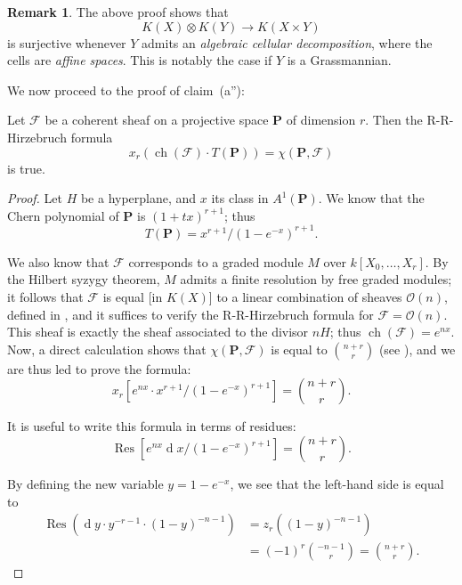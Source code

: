 \documentclass{article}
\theoremstyle{plain}
\newenvironment{proposition}[1]
    {\renewcommand\theinnercustomproposition{#1}\innercustomproposition}
    {\endinnercustomproposition}
\theoremstyle{definition}
\newtheorem*{remark}{Remark}
\newcommand{\sh}[1]{{\mathscr{#1}}}
\newcommand{\PP}{\mathbf{P}}
\newcommand{\dd}{\operatorname{d}\!}
\DeclareMathOperator{\ch}{ch}
\newcommand{\oldpage}[1]{\marginpar{\footnotesize$\Big\vert$ \textit{p.~#1}}}
\begin{document}
\begin{remark}
  The above proof shows that
  \[
    K(X)\otimes K(Y) \to K(X\times Y)
  \]
  is surjective whenever $Y$ admits an \emph{algebraic cellular decomposition}, where the cells are \emph{affine spaces}.
  This is notably the case if $Y$ is a Grassmannian.
\end{remark}

We now proceed to the proof of claim~(a''):

\begin{proposition}{10}
\label{proposition10}
  Let $\sh{F}$ be a coherent sheaf on a projective space $\PP$
\oldpage{119}
  of dimension $r$.
  Then the R-R-Hirzebruch formula
  \[
    x_r(\ch(\sh{F})\cdot T(\PP)) = \chi(\PP,\sh{F})
  \]
  is true.
\end{proposition}

\begin{proof}
  Let $H$ be a hyperplane, and $x$ its class in $A^1(\PP)$.
  We know that the Chern polynomial of $\PP$ is $(1+tx)^{r+1}$;
  thus
  \[
    T(\PP) = x^{r+1}/(1-e^{-x})^{r+1}.
  \]

  We also know that $\sh{F}$ corresponds to a graded module $M$ over $k[X_0,\ldots,X_r]$.
  By the Hilbert syzygy theorem, $M$ admits a finite resolution by free graded modules;
  it follows that $\sh{F}$ is equal [in $K(X)$] to a linear combination of sheaves $\sh{O}(n)$, defined in \cite[p.~246]{12}, and it suffices to verify the R-R-Hirzebruch formula for $\sh{F}=\sh{O}(n)$.
  This sheaf is exactly the sheaf associated to the divisor $nH$;
  thus $\ch(\sh{F})=e^{nx}$.
  Now, a direct calculation shows that $\chi(\PP,\sh{F})$ is equal to $\binom{n+r}{r}$ (see \cite[p.~275]{12}), and we are thus led to prove the formula:
  \[
  \label{10equation*}
    x_r[e^{nx}\cdot x^{r+1}/(1-e^{-x})^{r+1}] = \binom{n+r}{r}.
    \tag{$\star$}
  \]

  It is useful to write this formula in terms of residues:
  \[
  \label{10equation**}
    \operatorname{Res}[e^{nx}\dd x/(1-e^{-x})^{r+1}] = \binom{n+r}{r}.
    \tag{$\star\star$}
  \]

  By defining the new variable $y=1-e^{-x}$, we see that the left-hand side is equal to
  \begin{align*}
    \operatorname{Res}(\dd y\cdot y^{-r-1}\cdot(1-y)^{-n-1})
    &= z_r((1-y)^{-n-1})
  \\&= (-1)^r\binom{-n-1}{r}
    = \binom{n+r}{r}.
  \end{align*}
\end{proof}
\end{document}
